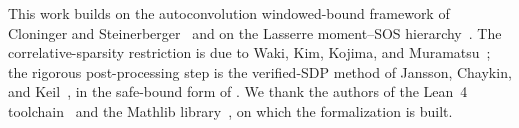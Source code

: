 \documentclass[11pt, letterpaper]{article}
\theoremstyle{paperplain}
\theoremstyle{paperdef}
\begin{document}
This work builds on the autoconvolution windowed-bound framework of
Cloninger and Steinerberger~\cite{CS17} and on the Lasserre
moment--SOS hierarchy~\cite{Lasserre2001,Parrilo03,Lasserre2015}.  The
correlative-sparsity restriction is due to Waki, Kim, Kojima, and
Muramatsu~\cite{Waki2006}; the rigorous post-processing step is the
verified-SDP method of Jansson, Chaykin, and
Keil~\cite{JanssonChaykinKeil2008}, in the safe-bound form of
\cite{PeyrlParrilo2008}.  We thank the authors of the Lean~4
toolchain~\cite{Lean4} and the Mathlib library~\cite{Mathlib}, on
which the formalization is built.





\end{document}
